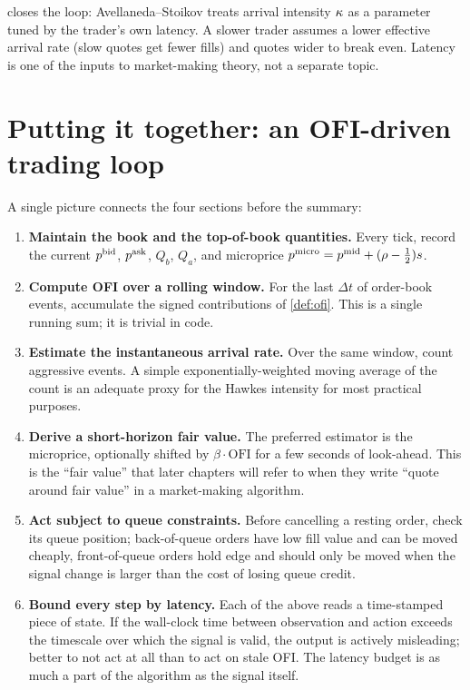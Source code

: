  closes the loop: Avellaneda--Stoikov
treats arrival intensity $\kappa$ as a parameter tuned by the
trader's own latency. A slower trader assumes a lower effective
arrival rate (slow quotes get fewer fills) and quotes wider to
break even. Latency is one of the inputs to market-making theory,
not a separate topic.

\section{Putting it together: an OFI-driven trading loop}
\label{sec:together}

A single picture connects the four sections before the summary:

\begin{enumerate}
  \item \textbf{Maintain the book and the top-of-book
  quantities.} Every tick, record the current $p^{\mathrm{bid}}$, $p^{\mathrm{ask}}$,
  $Q_b$, $Q_a$, and microprice
  $p^{\mathrm{micro}} = p^{\mathrm{mid}} + (\rho - \tfrac{1}{2})s$.
  \item \textbf{Compute OFI over a rolling window.} For the last
  $\Delta t$ of order-book events, accumulate the signed
  contributions of \cref{def:ofi}. This is a single running
  sum; it is trivial in code.
  \item \textbf{Estimate the instantaneous arrival rate.} Over
  the same window, count aggressive events. A simple
  exponentially-weighted moving average of the count is an
  adequate proxy for the Hawkes intensity for most practical
  purposes.
  \item \textbf{Derive a short-horizon fair value.} The
  preferred estimator is the microprice, optionally shifted by
  $\beta \cdot \mathrm{OFI}$ for a few seconds of look-ahead.
  This is the ``fair value'' that later chapters will refer to
  when they write ``quote around fair value'' in a
  market-making algorithm.
  \item \textbf{Act subject to queue constraints.} Before
  cancelling a resting order, check its queue position;
  back-of-queue orders have low fill value and can be moved
  cheaply, front-of-queue orders hold edge and should only be
  moved when the signal change is larger than the cost of
  losing queue credit.
  \item \textbf{Bound every step by latency.} Each of the above
  reads a time-stamped piece of state. If the wall-clock time
  between observation and action exceeds the timescale over
  which the signal is valid, the output is actively
  misleading; better to not act at all than to act on stale
  OFI. The latency budget is as much a part of the algorithm as
  the signal itself.
\end{enumerate}

